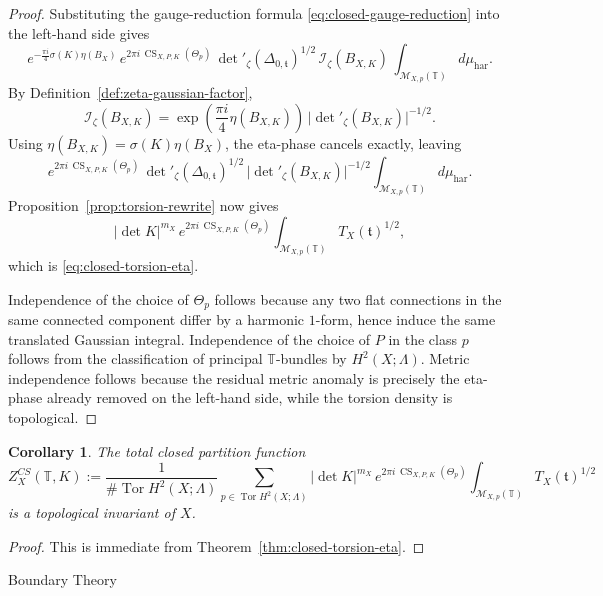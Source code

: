 \documentclass[12pt]{amsart}
\makeatletter
\renewcommand\section{\@startsection{section}{1}%
  \z@{.7\linespacing\@plus\linespacing}{.5\linespacing}%
  {\normalfont\bfseries\centering}}
\numberwithin{equation}{section}
\newtheorem{corollary}[theorem]{Corollary}
\makeatother
\begin{document}
\begin{proof}
Substituting the gauge-reduction formula
\eqref{eq:closed-gauge-reduction} into the left-hand side gives
\[
e^{-\frac{\pi i}{4}\sigma(K)\eta(B_X)}\,
e^{2\pi i\,\operatorname{CS}_{X,P,K}(\Theta_p)}\,
\det\nolimits'_{\zeta}(\Delta_{0,\mathfrak t})^{1/2}\,
\mathcal I_\zeta(B_{X,K})\,
\int_{\mathcal M_{X,p}(\mathbb T)} d\mu_{\mathrm{har}}.
\]
By Definition~\ref{def:zeta-gaussian-factor},
\[
\mathcal I_\zeta(B_{X,K})
=
\exp\!\left(\frac{\pi i}{4}\eta(B_{X,K})\right)\,
\bigl|\det\nolimits'_{\zeta}(B_{X,K})\bigr|^{-1/2}.
\]
Using \(\eta(B_{X,K})=\sigma(K)\eta(B_X)\), the eta-phase cancels exactly, leaving
\[
e^{2\pi i\,\operatorname{CS}_{X,P,K}(\Theta_p)}\,
\det\nolimits'_{\zeta}(\Delta_{0,\mathfrak t})^{1/2}\,
\bigl|\det\nolimits'_{\zeta}(B_{X,K})\bigr|^{-1/2}
\int_{\mathcal M_{X,p}(\mathbb T)} d\mu_{\mathrm{har}}.
\]
Proposition~\ref{prop:torsion-rewrite} now gives
\[
|\det K|^{m_X}\,
e^{2\pi i\,\operatorname{CS}_{X,P,K}(\Theta_p)}
\int_{\mathcal M_{X,p}(\mathbb T)}
T_X(\mathfrak t)^{1/2},
\]
which is \eqref{eq:closed-torsion-eta}.

Independence of the choice of \(\Theta_p\) follows because any two flat connections in the same connected component differ by a harmonic \(1\)-form, hence
induce the same translated Gaussian integral. Independence of the choice of \(P\) in the
class \(p\) follows from the classification of principal \(\mathbb T\)-bundles by
\(H^2(X;\Lambda)\). Metric independence follows because the residual metric anomaly is
precisely the eta-phase already removed on the left-hand side, while the torsion density
is topological.
\end{proof}

\begin{corollary}
\label{cor:closed-total-partition}
The total closed partition function
\[\label{closed-total-partition}
Z^{CS}_X(\mathbb T,K)
:=
\frac{1}{\#\operatorname{Tor}H^2(X;\Lambda)}
\sum_{p\in \operatorname{Tor}H^2(X;\Lambda)}
|\det K|^{m_X}\,
e^{2\pi i\,\operatorname{CS}_{X,P,K}(\Theta_p)}
\int_{\mathcal M_{X,p}(\mathbb T)}
T_X(\mathfrak t)^{1/2}
\]
is a topological invariant of \(X\).
\end{corollary}

\begin{proof}
This is immediate from Theorem~\ref{thm:closed-torsion-eta}.
\end{proof}


\section{Boundary Theory}
\end{document}
